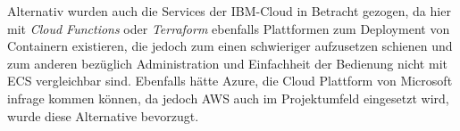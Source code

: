 Alternativ wurden auch die Services der IBM-Cloud in Betracht gezogen, da hier mit \textit{Cloud Functions} oder \textit{Terraform} ebenfalls Plattformen zum Deployment von Containern existieren, die jedoch zum einen schwieriger aufzusetzen schienen und zum anderen bezüglich Administration und Einfachheit der Bedienung nicht mit \ac{ECS} vergleichbar sind. Ebenfalls hätte Azure, die Cloud Plattform von Microsoft infrage kommen können, da jedoch \ac{AWS} auch im Projektumfeld eingesetzt wird, wurde diese Alternative bevorzugt. \pagebreak
